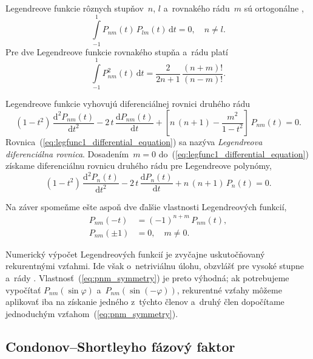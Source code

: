 \documentclass[a4paper,12pt]{book}
\newcommand{\diff}{\mathrm d}
\begin{document}
Legendreove funkcie rôznych stupňov~$n$, $l$ a~rovnakého rádu~$m$ sú
ortogonálne \parencite{Freeden2009},
%
\begin{equation}
\label{eq:pnm_orthogonality}
\int\limits_{-1}^{1} P_{nm}(t) \, P_{lm}(t) \, \diff t = 0{,} \quad n \neq l{.}
\end{equation}
%
Pre dve Legendreove funkcie rovnakého stupňa a~rádu platí
\begin{equation}
\label{eq:pnm_times_pnm}
\int\limits_{-1}^{1} P^2_{nm}(t) \, \diff t = \frac{2}{2n + 1} \, \frac{(n 
+ m)!}{(n - m)!}{.}
\end{equation}

Legendreove funkcie vyhovujú diferenciálnej rovnici druhého rádu 
\parencite{SansoGeoidDetermination}
%
\begin{equation}
\label{eq:legfunc1_differential_equation}
(1 - t^2) \, \frac{\diff^2 P_{nm}(t)}{\diff t^2} - 2 \, t \, \frac{\diff 
P_{nm}(t)}{\diff t} + \left[ n \, (n + 1) - \frac{m^2}{1 - t^2} \right] \, 
P_{nm}(t) = 0{.}
\end{equation}
%
Rovnica~(\ref{eq:legfunc1_differential_equation}) sa nazýva \emph{Legendreova 
diferenciálna rovnica}.  Dosadením~$m = 0$ 
do~(\ref{eq:legfunc1_differential_equation}) získame diferenciálnu rovnicu 
druhého rádu pre Legendreove polynómy,
%
\begin{equation}
\label{eq:legpol_differential_equation}
(1 - t^2) \, \frac{\diff^2 P_n(t)}{\diff t^2} - 2 \, t \, \frac{\diff 
P_n(t)}{\diff t} + n \, (n + 1) \, P_n(t) = 0{.}
\end{equation}

Na záver spomeňme ešte aspoň dve ďalšie vlastnosti Legendreových funkcií,
%
\begin{align}
\label{eq:pnm_symmetry}
P_{nm}(-t) &= (-1)^{n + m} \, P_{nm}(t){,}\\
%
P_{nm}(\pm1) &= 0{,} \quad m \neq 0{.}
\end{align}

Numerický výpočet Legendreových funkcií je zvyčajne uskutočňovaný rekurentnými 
vzťahmi.  Ide však o~netriviálnu úlohu, obzvlášť pre vysoké stupne a~rády 
\parencite{Holmes2002a,Fukushima2012a,Ishioka2018}.  
Vlastnosť~(\ref{eq:pnm_symmetry}) je preto výhodná; ak potrebujeme vypočítať 
$P_{nm}(\sin\varphi)$ a~$P_{nm}(\sin(-\varphi))$, rekurentné vzťahy môžeme 
aplikovať iba na získanie jedného z~týchto členov a~druhý člen dopočítame 
jednoduchým vzťahom~(\ref{eq:pnm_symmetry}).

\subsection{Condonov--Shortleyho fázový faktor}
\label{sec:legendre_functions_cs_factor}
\end{document}
